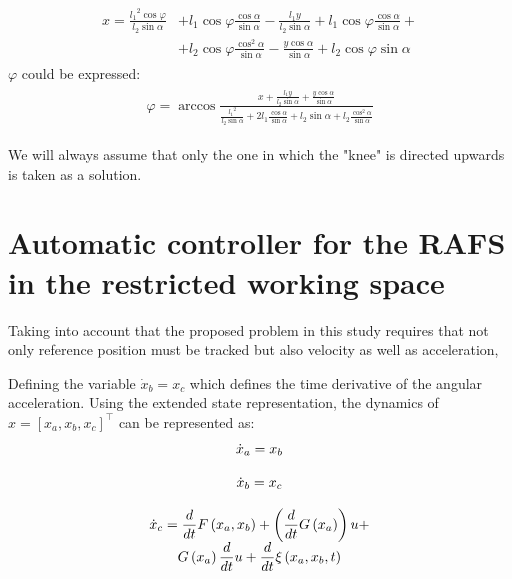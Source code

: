 \documentclass[journal,twocolumn]{IEEEtran}
\begin{document}
\begin{eqnarray*}
    \displaystyle
    \begin{aligned}
       x = \frac{{l_1}^2 \cos\varphi}{l_2 \sin\alpha} &+ l_1 \cos\varphi \frac{\cos\alpha}{\sin\alpha} - \frac{l_1 y}{l_2 \sin\alpha} + l_1 \cos\varphi \frac{\cos\alpha}{\sin\alpha} +
       \\
       &+ l_2 \cos\varphi \frac{\cos^2\alpha}{\sin\alpha} - \frac{y \cos\alpha}{\sin\alpha} + l_2 \cos\varphi \sin\alpha
    \end{aligned}
\end{eqnarray*}
$\varphi$ could be expressed:
\begin{eqnarray}
    \begin{aligned}
    \varphi = \arccos 
    \displaystyle
    \frac{\displaystyle x + \frac{l_1 y}{l_2 \sin\alpha} + \frac{y \cos\alpha}{\sin\alpha}}
    {\displaystyle \frac{{l_1}^2}{l_2 \sin\alpha} + 2 l_1 \frac{\cos\alpha}{\sin\alpha} + l_2 \sin\alpha + l_2 \frac{\cos^2\alpha}{\sin\alpha}}
    \end{aligned}
    \label{eq:phi}
 \end{eqnarray}
 
 We will always assume that only the one in which the "knee" is directed upwards is taken as a solution.

\section{Automatic controller for the RAFS in the restricted working space}

Taking into account that the proposed problem in this study requires that not only reference position must be tracked but also velocity as well as acceleration, 


Defining the variable $\dot{x}_{b}=x_{c}$ which defines the time derivative of the angular acceleration. Using the extended state representation, the dynamics of $x=\left[ x_{a},x_{b},x_{c}\right] ^{\top }$ can be represented as:
%
\begin{equation}
\begin{array}{c}
\dot{x}_{a}=x_{b} \\ 
\\
\dot{x}_{b}=x_{c} \\ 
\\
\dot{x}_{c}=\dfrac{d}{dt} F \left( x_{a},x_{b}\right) +\left( \dfrac{d}{%
dt}G\left( x_{a}\right) \right) u+ \\
G\left( x_{a}\right) \dfrac{d}{dt}%
u+\dfrac{d}{dt}\xi \left( x_{a},x_{b},t\right) 
\end{array}%
\label{RAFS_Dynamics}
\end{equation}
\end{document}
